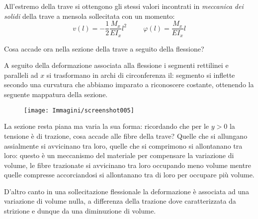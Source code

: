 \documentclass{article}
\begin{document}
\begin{adjustwidth}{2in}{}
		All'estremo della trave si ottengono gli stessi valori incontrati in \textit{meccanica dei solidi} della trave a mensola sollecitata con un momento:
		\[ v(l) = -\dfrac{1}{2}\dfrac{M_x}{EI_x}l^2 \hspace{1cm} \varphi(l) = \dfrac{M_x}{EI_x}l\]
		
		Cosa accade ora nella sezione della trave a seguito della flessione? 
		
		A seguito della deformazione associata alla flessione i segmenti rettilinei e paralleli ad $x$ si trasformano in archi di circonferenza il: segmento si inflette secondo una curvatura che abbiamo imparato a riconoscere costante, ottenendo la seguente mappatura della sezione.
		
\begin{figure}[H]
	\centering
	\texttt{[image: Immagini/screenshot005]}
	\label{fig:screenshot005}
\end{figure}

		La sezione resta piana ma varia la sua forma: ricordando che per le $y>0$ la tensione è di trazione, cosa accade alle fibre della trave? Quelle che si allungano assialmente si avvicinano tra loro, quelle che si comprimono si allontanano tra loro: questo è un meccanismo del materiale per compensare la variazione di volume, le fibre trazionate si avvicinano tra loro occupando meno volume mentre quelle compresse accorciandosi si allontanano tra di loro per occupare più volume.
		
		D'altro canto in una sollecitazione flessionale la deformazione è associata ad una variazione di volume nulla, a differenza della trazione dove caratterizzata da strizione e dunque da una diminuzione di volume. \newline 
		

\end{adjustwidth}
\end{document}
